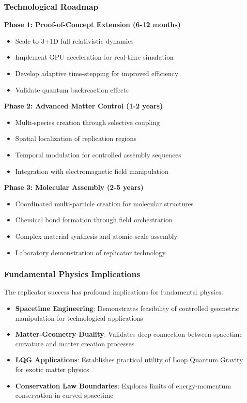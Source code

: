 \documentclass[11pt]{article}
\begin{document}
\subsubsection*{Technological Roadmap}

\textbf{Phase 1: Proof-of-Concept Extension (6-12 months)}
\begin{itemize}
\item Scale to 3+1D full relativistic dynamics
\item Implement GPU acceleration for real-time simulation
\item Develop adaptive time-stepping for improved efficiency
\item Validate quantum backreaction effects
\end{itemize}

\textbf{Phase 2: Advanced Matter Control (1-2 years)}
\begin{itemize}
\item Multi-species creation through selective coupling
\item Spatial localization of replication regions
\item Temporal modulation for controlled assembly sequences
\item Integration with electromagnetic field manipulation
\end{itemize}

\textbf{Phase 3: Molecular Assembly (2-5 years)}
\begin{itemize}
\item Coordinated multi-particle creation for molecular structures
\item Chemical bond formation through field orchestration
\item Complex material synthesis and atomic-scale assembly
\item Laboratory demonstration of replicator technology
\end{itemize}

\subsubsection*{Fundamental Physics Implications}

The replicator success has profound implications for fundamental physics:

\begin{itemize}
\item \textbf{Spacetime Engineering}: Demonstrates feasibility of controlled geometric manipulation for technological applications
\item \textbf{Matter-Geometry Duality}: Validates deep connection between spacetime curvature and matter creation processes
\item \textbf{LQG Applications}: Establishes practical utility of Loop Quantum Gravity for exotic matter physics
\item \textbf{Conservation Law Boundaries}: Explores limits of energy-momentum conservation in curved spacetime
\end{itemize}
\end{document}
